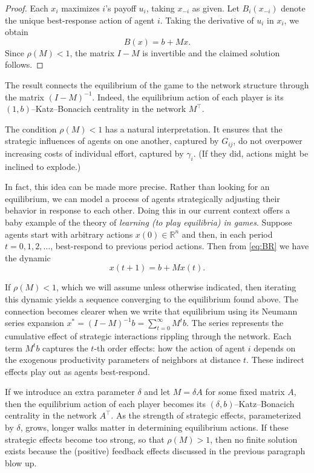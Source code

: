 \documentclass{notices}
\theoremstyle{definition}\newtheorem{problem}{Problem}
\theoremstyle{definition} \newtheorem{remark}{Remark}
\theoremstyle{definition} \newtheorem{claim}{Claim}
\theoremstyle{definition} \newtheorem{thm}{Theorem}
\theoremstyle{definition} \newtheorem*{thmNoNum}{Theorem}
\theoremstyle{definition} \newtheorem{definition}{Definition}
\theoremstyle{definition} \theoremstyle{remark}
\theoremstyle{definition} \newtheorem{note}{Note}
\theoremstyle{definition} \newtheorem{notation}{Notation}
\theoremstyle{definition} \theoremstyle{plain}
\theoremstyle{definition} \newtheorem{condition}{Condition}
\theoremstyle{definition} \newtheorem{lem}{Lemma}
\theoremstyle{definition} \newtheorem{corollary}{Corollary}
\theoremstyle{definition} \newtheorem{prop}{Proposition}
\theoremstyle{definition} \newtheorem{ax}{Axiom}
\theoremstyle{definition} \newtheorem{assumption}{Assumption}
\theoremstyle{definition} \newtheorem{example}{Example}
\theoremstyle{definition} \newtheorem{rmk}{Remark}
\theoremstyle{definition} \newtheorem{res}{Result}
\theoremstyle{definition} \newtheorem{que}{Question}
\theoremstyle{definition} \newtheorem{conjecture}{Conjecture}
\theoremstyle{definition}
\begin{document}
\begin{proof}
Each $x_i$ maximizes $i$'s payoff $u_i$, taking $x_{-i}$ as given. Let $B_i(x_{-i})$ denote the unique best-response action of agent $i$. Taking the derivative of $u_i$ in $x_i$, we obtain
\begin{equation}
B(x) = b + M x. \label{eq:BR}
\end{equation}
Since $\rho(M) < 1$, the matrix $I - M$ is invertible  and the claimed solution follows.
\end{proof}


The result connects the equilibrium of the game to the network structure through the matrix $(I - M)^{-1}$. Indeed, the equilibrium action of each player is its $(1,b)$--Katz--Bonacich centrality in the network $M^\top$.


The condition $\rho(M) < 1$ has a natural interpretation. It ensures that the strategic influences of agents on one another, captured by $G_{ij}$, do not overpower increasing costs of individual effort, captured by $\gamma_i$. (If they did, actions might be inclined to explode.)

In fact, this idea can be made more precise. Rather than looking for an equilibrium, we can model a process of agents strategically adjusting their behavior in response to each other. Doing this in our current context offers a baby example of the theory of \emph{learning (to play equilibria) in games}. Suppose agents start with arbitrary actions $x(0) \in \mathbb{R}^n$ and then, in each period $t=0,1,2,\ldots$, best-respond to previous period actions. Then from \cref{eq:BR} we have the dynamic $$ x(t+1) = b + Mx(t).$$ 

If $\rho(M)<1$, which we will assume unless otherwise indicated, then iterating this dynamic yields a sequence converging to the equilibrium found above. The connection becomes clearer when we write that equilibrium using its Neumann series expansion $
x^* = (I - M)^{-1} b = \sum_{t=0}^\infty M^t b.
$
The series represents the cumulative effect of strategic interactions rippling through the network. Each term $M^t b$ captures the $t$-th order effects: how the action of agent $i$ depends on the exogenous productivity parameters of neighbors at distance $t$. These indirect effects play out as agents best-respond.  


If we introduce an extra parameter $\delta$ and let $M= \delta A$ for some fixed matrix $A$, then the equilibrium action of each player becomes its $(\delta,{b})$--Katz--Bonacich centrality in the network $A^\top$. As the strength of strategic effects,  parameterized by $\delta$, grows, longer walks matter in determining equilibrium actions. If these strategic effects become too strong, so that $\rho(M)>1$, then no finite solution exists because the (positive) feedback effects discussed in the previous paragraph blow up.
\end{document}
